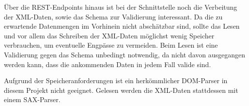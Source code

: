 Über die REST-Endpoints hinaus ist bei der Schnittstelle noch die Verbeitung der XML-Daten,
sowie das Schema zur Validierung interessant.
Da die zu erwartende Datenmengen im Vorhinein nicht abschätzbar sind,
sollte das Lesen und vor allem das Schreiben der XML-Daten möglichst wenig Speicher
verbrauchen, um eventuelle Engpässe zu vermeiden. Beim Lesen ist eine Validierung
gegen das Schema unbedingt notwendig, da nicht davon ausgegangen werden kann,
dass die ankommenden Daten in jedem Fall valide sind.

Aufgrund der Speicheranforderungen ist ein herkömmlicher DOM-Parser in diesem Projekt
nicht geeignet. Gelesen werden die XML-Daten stattdessen mit einem SAX-Parser.


